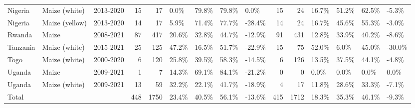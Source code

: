 \begin{table}[ht]
\begin{tabular}{lllrrllllrrllll}
  Nigeria & Maize (white) & 2013-2020 &  15 &  17 & 0.0\% & 79.8\% & 79.8\% & 0.0\% &  15 &  24 & 16.7\% & 51.2\% & 62.5\% & -5.3\% \\ 
  Nigeria & Maize (yellow) & 2013-2020 &  14 &  17 & 5.9\% & 71.4\% & 77.7\% & -28.4\% &  14 &  24 & 16.7\% & 45.6\% & 55.3\% & -3.0\% \\ 
  Rwanda & Maize & 2008-2021 &  87 & 417 & 20.6\% & 32.8\% & 44.7\% & -12.9\% &  91 & 431 & 12.8\% & 33.9\% & 40.2\% & -8.6\% \\ 
  Tanzania & Maize (white) & 2015-2021 &  25 & 125 & 47.2\% & 16.5\% & 51.7\% & -22.9\% &  15 &  75 & 52.0\% & 6.0\% & 45.0\% & -30.0\% \\ 
  Togo & Maize (white) & 2000-2020 &   6 & 120 & 25.8\% & 39.5\% & 58.3\% & -14.5\% &   6 & 126 & 13.5\% & 37.5\% & 44.1\% & -4.8\% \\ 
  Uganda & Maize & 2009-2021 &   1 &   7 & 14.3\% & 69.1\% & 84.1\% & -21.2\% &   0 &   0 & 0.0\% & 0.0\% & 0.0\% & 0.0\% \\ 
  Uganda & Maize (white) & 2009-2021 &  13 &  59 & 32.2\% & 22.1\% & 41.7\% & -18.9\% &   4 &  17 & 11.8\% & 28.6\% & 33.3\% & -7.1\% \\ 
  Total &   &   & 448 & 1750 & 23.4\% & 40.5\% & 56.1\% & -13.6\% & 415 & 1712 & 18.3\% & 35.3\% & 46.1\% & -9.3\% \\ 
   \hline
\end{tabular}
\end{table}
